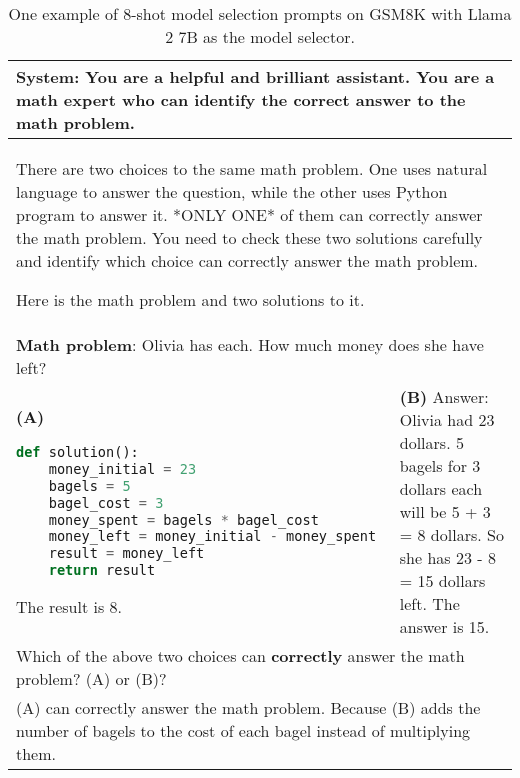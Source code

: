 \documentclass[11pt]{article}
\begin{document}
\begin{table*}[ht]
    \centering
    \begin{tabular}{p{}|p{}}
    \toprule
     \multicolumn{2}{p{0.92\textwidth}}{\small 
     \textbf{System}: You are a helpful and brilliant assistant. You are a math expert who can identify the correct answer to the math problem.}\\
     \midrule
     \multicolumn{2}{p{0.92\textwidth}}{\small There are two choices to the same math problem. One uses natural language to answer the question, while the other uses Python program to answer it. *ONLY ONE* of them can correctly answer the math problem. 
You need to check these two solutions carefully and identify which choice can correctly answer the math problem. 

Here is the math problem and two solutions to it.} 
\\
      \multicolumn{2}{p{0.92\textwidth}}{\small \textbf{Math problem}: Olivia has \3 each. How much money does she have left?} \\
     
    \midrule

    \small \textbf{(A)}
        \lstset{style=mystyle}
     \begin{lstlisting}[language=Python]
def solution():
    money_initial = 23
    bagels = 5
    bagel_cost = 3
    money_spent = bagels * bagel_cost
    money_left = money_initial - money_spent
    result = money_left
    return result
     \end{lstlisting} 
The result is 8.
     &
    \small \textbf{(B)}  \newline
    \newline
    \small Answer: \newline
     \small Olivia had 23 dollars. \newline
     \small 5 bagels for 3 dollars each will be 5 + 3 = 8 dollars. \newline
     \small So she has 23 - 8 = 15 dollars left.\newline
     \small The answer is 15.\newline
     \\

     \midrule
     \multicolumn{2}{p{0.92\textwidth}}{\small Which of the above two choices can \textbf{correctly} answer the math problem? (A) or (B)? }\\
     \midrule
      \multicolumn{2}{p{0.92\textwidth}}{\small (A) can correctly answer the math problem. Because (B) adds the number of bagels to the cost of each bagel instead of multiplying them.}\\
     \bottomrule
    \end{tabular}
    \caption{One example of 8-shot model selection prompts on GSM8K with Llama 2 7B as the model selector.}

    \label{tab:llama2_7b_example_math}
\end{table*}
\end{document}
